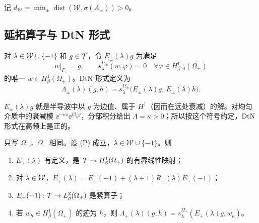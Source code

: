 \documentclass[11pt,a4paper,fontset=fandol]{ctexart}
\begin{document}
记 $d_{\mathcal W}=\min_\pm\operatorname{dist}(\mathcal W,\sigma(A_\pm))>0$。

\subsection{延拓算子与 DtN 形式}

\begin{definition}
对 $\lambda\in\mathcal W\cup\{-1\}$ 和 $g\in\mathcal T$，令 $E_\pm(\lambda)g$ 为满足
\[
w|_{\Gamma_\pm}=g,\qquad s^{\Omega_\pm}_\lambda(w,\varphi)=0\quad\forall\varphi\in H^1_{\beta,0}(\Omega_\pm)
\]
的唯一 $w\in H^1_\beta(\Omega_\pm)$。DtN 形式定义为
\begin{equation}
\label{eq:dtn-form}
\Lambda_\pm(\lambda)(g,h)=s^{\Omega_\pm}_\lambda\bigl(E_\pm(\lambda)g,\,E_\pm(\lambda)h\bigr).
\end{equation}
\end{definition}

$E_\pm(\lambda)g$ 就是半导波中以 $g$ 为边值、属于 $H^1$（因而在远处衰减）的解。对均匀介质中的衰减模 $\ee^{-\kappa s}\ee^{\ii\beta_ky}$，分部积分给出 $\Lambda=\kappa>0$；所以按这个符号约定，DtN 形式在高频上是正的。

\begin{lemma}[延拓]
\label{lem:extension}
只写 $\Omega_+$，$\Omega_-$ 相同。设 (P) 成立，$\lambda\in\mathcal W\cup\{-1\}$。则
\begin{enumerate}[label=(\alph*)]
\item $E_+(\lambda)$ 有定义，是 $\mathcal T\to H^1_\beta(\Omega_+)$ 的有界线性映射；
\item 对 $\lambda\in\mathcal W$，$E_+(\lambda)=E_+(-1)+(\lambda+1)R_+(\lambda)E_+(-1)$；
\item $E_+(-1):\mathcal T\to L^2_\rho(\Omega_+)$ 是紧算子；
\item 若 $w_h\in H^1_\beta(\Omega_+)$ 的迹为 $h$，则 $\Lambda_+(\lambda)(g,h)=s^{\Omega_+}_\lambda(E_+(\lambda)g,w_h)$。
\end{enumerate}
\end{lemma}
\end{document}
